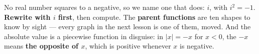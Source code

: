 \documentclass[10pt]{article}
\begin{document}
\vspace{0.14in}

\begin{remindbox}
\small
No real number squares to a negative, so we name one that does: $i$, with $i^2 = -1$.
\textbf{Rewrite with $i$ first}, then compute. The \textbf{parent functions} are ten shapes
to know by sight --- every graph in the next lesson is one of them, moved. And the absolute
value is a piecewise function in disguise: in $|x| = -x$ for $x < 0$, the $-x$ means
\textbf{the opposite of $x$}, which is positive whenever $x$ is negative.
\end{remindbox}
\end{document}
